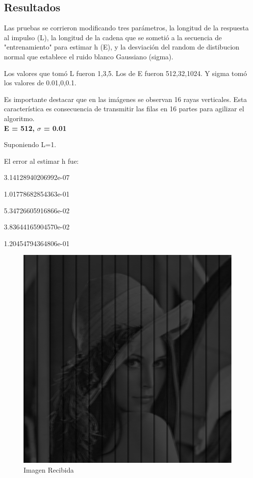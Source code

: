 \documentclass{article}
\begin{document}
\begin{multicols}{2}
\section{Resultados}

\par Las pruebas se corrieron modificando tres parámetros, la longitud de la respuesta al impulso (L), la longitud de la cadena que se sometió a la secuencia de "entrenamiento" para estimar h (E), y la desviación del random de distibucion normal que establece el ruido blanco Gaussiano (sigma).
\par Los valores que tomó L fueron 1,3,5. Los de E fueron 512,32,1024. Y sigma tomó los valores de 0.01,0,0.1.
\par Es importante destacar que en las imágenes se observan 16 rayas verticales. Esta característica es consecuencia de transmitir las filas en 16 partes para agilizar el algoritmo.\\

\textbf{\large E = 512, $\sigma$ = 0.01  }\\


\par \large{Suponiendo L=1.}
\par El error al estimar h fue:\\ 
\par   3.14128940206992e-07
\par   1.01778682854363e-01
\par   5.34726605916866e-02
\par   3.83644165904570e-02
\par   1.20454794364806e-01\\


\begin{figure}[H]
\centering
\includegraphics[scale=0.2]{../img/received_part3a.png}
\caption{Imagen Recibida}


\end{figure}
\end{multicols}
\end{document}
